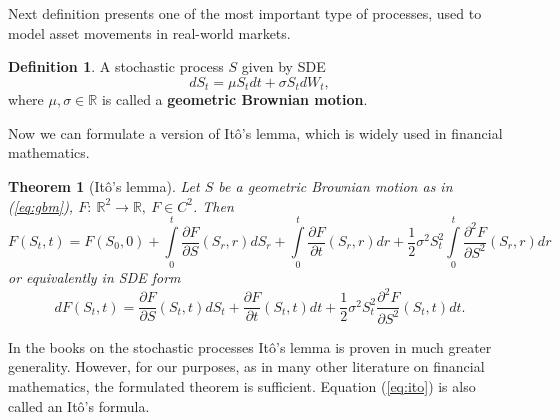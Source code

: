 \documentclass[a4paper,11pt, twoside]{book}
\newtheorem{thm}{Theorem}[chapter]
\theoremstyle{definition}
\newtheorem{mydef}{Definition}[chapter]
\theoremstyle{remark}
\def\R{{\mathbb{R}}}
\begin{document}
Next definition presents one of the most important type of processes, used to model asset movements in real-world markets.
\begin{mydef}
 A stochastic process $S$ given by SDE
 \begin{equation}
  dS_t = \mu S_t dt + \sigma S_t dW_t, 
  \label{eq:gbm}
 \end{equation}
where $\mu,\sigma \in \R$ is called a \textbf{geometric Brownian motion}.
\end{mydef}

Now we can formulate a version of It\^{o}'s lemma, which is widely used in financial mathematics.
\begin{thm}[It\^{o}'s lemma]
 \label{thm:ito}
  Let $S$ be a geometric Brownian motion as in (\ref{eq:gbm}), $F:\ \R^2 \rightarrow \R,\ F \in C^2$. Then 
  \begin{equation*}
   F(S_t, t) = F(S_0, 0) + \int\limits_0^t \frac{\partial F}{\partial S}(S_r,r)dS_r + \int\limits_0^t \frac{\partial F}{\partial t}(S_r,r)dr + \frac{1}{2}\sigma^2 S_t^2 \int\limits_0^t \frac{\partial^2 F}{\partial S^2}(S_r,r)dr
  \end{equation*}
  or equivalently in SDE form
  \begin{equation}
   \label{eq:ito}
   dF(S_t, t) = \frac{\partial F}{\partial S}(S_t,t)dS_t + \frac{\partial F}{\partial t}(S_t,t)dt + \frac{1}{2}\sigma^2 S_t^2 \frac{\partial^2 F}{\partial S^2}(S_t,t)dt   .
  \end{equation}  
\end{thm}

\noindent In the books on the stochastic processes It\^{o}'s lemma is proven in much greater generality. However, for our purposes, as in many other literature on financial mathematics, the formulated theorem is sufficient.
Equation (\ref{eq:ito}) is also called an It\^{o}'s formula.
\end{document}
